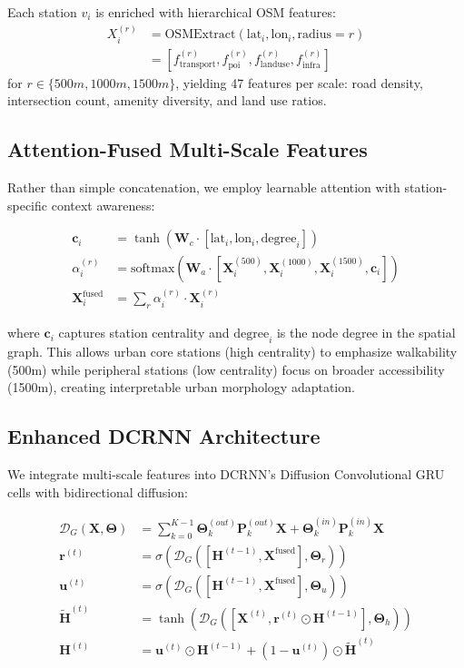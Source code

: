 \documentclass[10pt,twocolumn]{article}
\begin{document}
Each station $v_i$ is enriched with hierarchical OSM features:
\begin{align}
X_i^{(r)} &= \text{OSMExtract}(\text{lat}_i, \text{lon}_i, \text{radius}=r) \\
&= [f_{\text{transport}}^{(r)}, f_{\text{poi}}^{(r)}, f_{\text{landuse}}^{(r)}, f_{\text{infra}}^{(r)}]
\end{align}
for $r \in \{500m, 1000m, 1500m\}$, yielding 47 features per scale: road density, intersection count, amenity diversity, and land use ratios.

\subsection{Attention-Fused Multi-Scale Features}
Rather than simple concatenation, we employ learnable attention with station-specific context awareness:

\begin{align}
\mathbf{c}_i &= \tanh(\mathbf{W}_c \cdot [\text{lat}_i, \text{lon}_i, \text{degree}_i]) \\
\alpha_i^{(r)} &= \text{softmax}(\mathbf{W}_a \cdot [\mathbf{X}_i^{(500)}, \mathbf{X}_i^{(1000)}, \mathbf{X}_i^{(1500)}, \mathbf{c}_i]) \\
\mathbf{X}_i^{\text{fused}} &= \sum_{r} \alpha_i^{(r)} \cdot \mathbf{X}_i^{(r)}
\end{align}

where $\mathbf{c}_i$ captures station centrality and $\text{degree}_i$ is the node degree in the spatial graph. This allows urban core stations (high centrality) to emphasize walkability (500m) while peripheral stations (low centrality) focus on broader accessibility (1500m), creating interpretable urban morphology adaptation.

\subsection{Enhanced DCRNN Architecture}
We integrate multi-scale features into DCRNN's Diffusion Convolutional GRU cells with bidirectional diffusion:

\begin{align}
\mathcal{D}_G(\mathbf{X}, \boldsymbol{\Theta}) &= \sum_{k=0}^{K-1} \boldsymbol{\Theta}_k^{(out)} \mathbf{P}_k^{(out)} \mathbf{X} + \boldsymbol{\Theta}_k^{(in)} \mathbf{P}_k^{(in)} \mathbf{X} \\
\mathbf{r}^{(t)} &= \sigma(\mathcal{D}_G([\mathbf{H}^{(t-1)}, \mathbf{X}^{\text{fused}}], \boldsymbol{\Theta}_r)) \\
\mathbf{u}^{(t)} &= \sigma(\mathcal{D}_G([\mathbf{H}^{(t-1)}, \mathbf{X}^{\text{fused}}], \boldsymbol{\Theta}_u)) \\
\tilde{\mathbf{H}}^{(t)} &= \tanh(\mathcal{D}_G([\mathbf{X}^{(t)}, \mathbf{r}^{(t)} \odot \mathbf{H}^{(t-1)}], \boldsymbol{\Theta}_h)) \\
\mathbf{H}^{(t)} &= \mathbf{u}^{(t)} \odot \mathbf{H}^{(t-1)} + (1-\mathbf{u}^{(t)}) \odot \tilde{\mathbf{H}}^{(t)}
\end{align}
\end{document}

